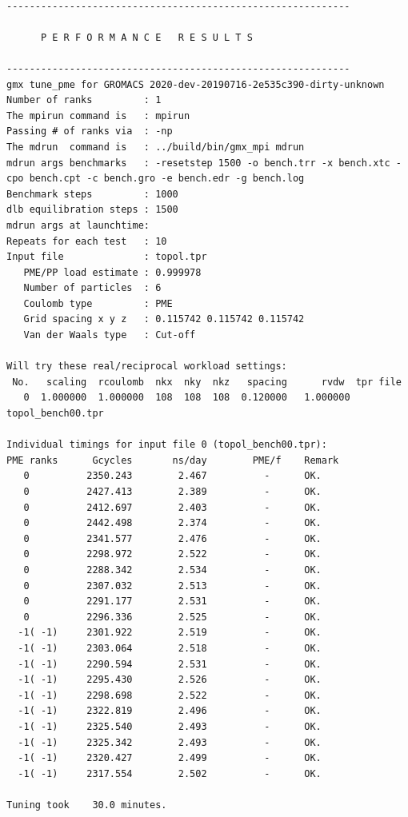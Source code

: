 \begin{lstlisting}[frame=single]

------------------------------------------------------------

      P E R F O R M A N C E   R E S U L T S

------------------------------------------------------------
gmx tune_pme for GROMACS 2020-dev-20190716-2e535c390-dirty-unknown
Number of ranks         : 1
The mpirun command is   : mpirun
Passing # of ranks via  : -np
The mdrun  command is   : ../build/bin/gmx_mpi mdrun
mdrun args benchmarks   : -resetstep 1500 -o bench.trr -x bench.xtc -cpo bench.cpt -c bench.gro -e bench.edr -g bench.log 
Benchmark steps         : 1000
dlb equilibration steps : 1500
mdrun args at launchtime: 
Repeats for each test   : 10
Input file              : topol.tpr
   PME/PP load estimate : 0.999978
   Number of particles  : 6
   Coulomb type         : PME
   Grid spacing x y z   : 0.115742 0.115742 0.115742
   Van der Waals type   : Cut-off

Will try these real/reciprocal workload settings:
 No.   scaling  rcoulomb  nkx  nky  nkz   spacing      rvdw  tpr file
   0  1.000000  1.000000  108  108  108  0.120000   1.000000  topol_bench00.tpr

Individual timings for input file 0 (topol_bench00.tpr):
PME ranks      Gcycles       ns/day        PME/f    Remark
   0          2350.243        2.467          -      OK.
   0          2427.413        2.389          -      OK.
   0          2412.697        2.403          -      OK.
   0          2442.498        2.374          -      OK.
   0          2341.577        2.476          -      OK.
   0          2298.972        2.522          -      OK.
   0          2288.342        2.534          -      OK.
   0          2307.032        2.513          -      OK.
   0          2291.177        2.531          -      OK.
   0          2296.336        2.525          -      OK.
  -1( -1)     2301.922        2.519          -      OK.
  -1( -1)     2303.064        2.518          -      OK.
  -1( -1)     2290.594        2.531          -      OK.
  -1( -1)     2295.430        2.526          -      OK.
  -1( -1)     2298.698        2.522          -      OK.
  -1( -1)     2322.819        2.496          -      OK.
  -1( -1)     2325.540        2.493          -      OK.
  -1( -1)     2325.342        2.493          -      OK.
  -1( -1)     2320.427        2.499          -      OK.
  -1( -1)     2317.554        2.502          -      OK.

Tuning took    30.0 minutes.


\end{lstlisting}
